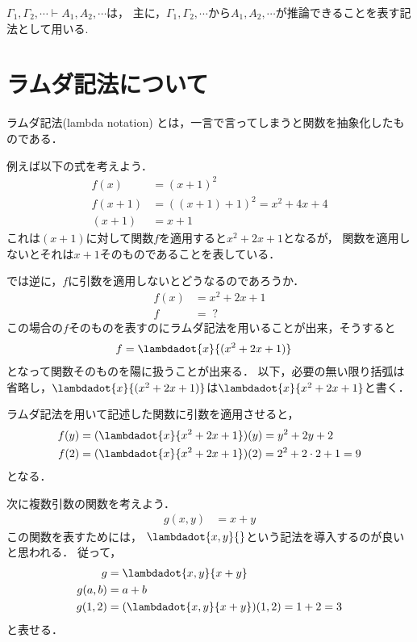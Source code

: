 \documentclass[a4paper,titlepage,report]{jsbook}
\begin{document}
$\Gamma_1,\Gamma_2,\cdots\vdash A_1, A_2,\cdots$は，
主に，$\Gamma_1, \Gamma_2, \cdots$から$A_1, A_2, \cdots$が推論できることを表す記法として用いる.

\section{ラムダ記法について}\label{sec:about-lambda-notation}
ラムダ記法(lambda notation) とは，一言で言ってしまうと関数を抽象化したものである．

例えば以下の式を考えよう．
\begin{align}
f(x) &= (x + 1)^2\\
f(x + 1) &= {\left((x + 1) + 1\right)}^2 = x^2 + 4x + 4\\
(x + 1) &= x + 1
\end{align}
これは$(x + 1)$に対して関数$f$を適用すると$x^2 + 2x + 1$となるが，
関数を適用しないとそれは$x + 1$そのものであることを表している．

では逆に，$f$に引数を適用しないとどうなるのであろうか．
\begin{align}
f(x) &= x^2 + 2x + 1\\
f    &= \;?
\end{align}
この場合の$f$そのものを表すのにラムダ記法を用いることが出来，そうすると
\begin{align}
f &= \lambdadot{x}{(x^2 + 2x + 1)}
\end{align}
となって関数そのものを陽に扱うことが出来る．
以下，必要の無い限り括弧は省略し，$\lambdadot{x}{(x^2 + 2x + 1)}$は$\lambdadot{x}{x^2 + 2x + 1}$と書く．

ラムダ記法を用いて記述した関数に引数を適用させると，
\begin{align}
f(y) &= (\lambdadot{x}{x^2 + 2x + 1})(y) = y^2 + 2y + 2 \\
f(2) &= (\lambdadot{x}{x^2 + 2x + 1})(2) = 2^2 + 2\cdot 2 + 1 = 9
\end{align}
となる．

次に複数引数の関数を考えよう．
\begin{align}
g(x, y) &= x + y
\end{align}
この関数を表すためには，
$\lambdadot{x,y}{}$という記法を導入するのが良いと思われる．
従って，
\begin{align}
\label{eq:lambda-multiple}
g &= \lambdadot{x,y}{x + y}\\
\label{eq:lambda-multiple-inst}
g(a, b) &= a + b\\
g(1, 2) &= (\lambdadot{x,y}{x + y})(1, 2) = 1 + 2 = 3
\end{align}
と表せる．
\end{document}
